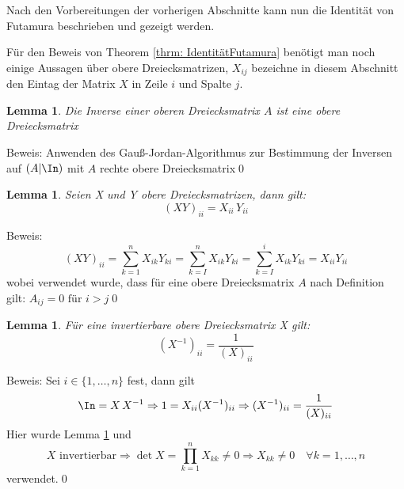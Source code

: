 \documentclass[a4paper,12pt]{report}
\newcommand{\inv}{^{-1}}
\newcommand{\1}{\mathds{1}}
\theoremstyle{plain} %
\newtheorem{lemma}[theorem]{Lemma}  %
\theoremstyle{definition} %
\theoremstyle{remark}
\begin{document}
            Nach den Vorbereitungen der vorherigen Abschnitte kann nun die Identität von Futamura beschrieben und gezeigt werden.

            Für den Beweis von Theorem \ref{thrm: IdentitätFutamura} benötigt man noch einige Aussagen über obere Dreiecksmatrizen, $X_{ij}$ bezeichne in diesem Abschnitt den Eintag der Matrix $X$ in Zeile $i$ und Spalte $j$.

            \begin{lemma}
                  \label{Hilfslemma_Futamura: Inv Dreieck}
                  Die Inverse einer oberen Dreiecksmatrix $A$ ist eine obere Dreiecksmatrix
            \end{lemma}
            Beweis: Anwenden des Gauß-Jordan-Algorithmus zur Bestimmung der Inversen auf $(A|\In)$ mit $A$ rechte obere Dreiecksmatrix\qed

            \begin{lemma}
                  \label{Hilfslemma_Futamura: Prod Dreieck}
                  Seien X und Y obere Dreiecksmatrizen, dann gilt:
                  $$(XY)_{ii} = X_{ii}\, Y_{ii}$$
            \end{lemma}
            Beweis:
            $$(XY)_{ii} = \sum_{k=1}^n X_{ik}Y_{ki} = \sum_{k=I}^{n}X_{ik}Y_{ki} = \sum_{k=I}^{i}X_{ik}Y_{ki} = X_{ii} Y_{ii}$$
            wobei verwendet wurde, dass für eine obere Dreiecksmatrix $A$ nach Definition gilt:
            $A_{ij} = 0 \text{ für }i>j$\qed

            \begin{lemma}
                  \label{Hilfslemma_Futamura: Diag Inv Dreieck}
                  Für eine invertierbare obere Dreiecksmatrix X gilt:
                  $$(X\inv)_{ii} = \frac 1 {(X)_{ii}}$$
            \end{lemma}
            Beweis: Sei $i\in\{1,\dots,n\}$ fest, dann gilt
            $$\In = X\,X\inv \Rightarrow 1 = X_{ii}(X\inv)_{ii} \Rightarrow (X\inv)_{ii} = \frac 1 {(X)_{ii}}$$
            Hier wurde Lemma \ref{Hilfslemma_Futamura: Prod Dreieck} und
            $$X \text{ invertierbar}\Rightarrow \det X = \prod_{k=1}^{n}X_{kk}\ne 0\Rightarrow X_{kk}\ne 0\quad \forall k=1,\dots,n$$
            verwendet.\qed\\
\end{document}
